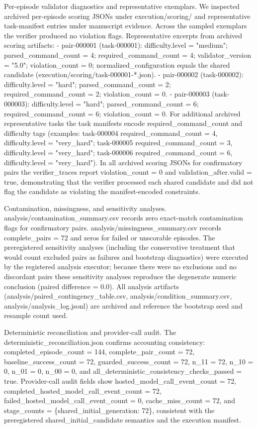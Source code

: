 \documentclass[conference]{IEEEtran}
\begin{document}
Per-episode validator diagnostics and representative exemplars. We inspected archived per-episode scoring JSONs under execution/scoring/ and representative task-manifest entries under manuscript evidence. Across the sampled exemplars the verifier produced no violation flags. Representative excerpts from archived scoring artifacts:
- pair-000001 (task-000001): difficulty.level = "medium"; parsed\_command\_count = 4; required\_command\_count = 4; validator\_version = "5.0"; violation\_count = 0; normalized\_configuration equals the shared candidate (execution/scoring/task-000001-*.json).
- pair-000002 (task-000002): difficulty.level = "hard"; parsed\_command\_count = 2; required\_command\_count = 2; violation\_count = 0.
- pair-000003 (task-000003): difficulty.level = "hard"; parsed\_command\_count = 6; required\_command\_count = 6; violation\_count = 0.
For additional archived representative tasks the task manifests encode required\_command\_count and difficulty tags (examples: task-000004 required\_command\_count = 4, difficulty.level = "very\_hard"; task-000005 required\_command\_count = 3, difficulty.level = "very\_hard"; task-000006 required\_command\_count = 6, difficulty.level = "very\_hard"). In all archived scoring JSONs for confirmatory pairs the verifier\_traces report violation\_count = 0 and validation\_after.valid = true, demonstrating that the verifier processed each shared candidate and did not flag the candidate as violating the manifest-encoded constraints.

Contamination, missingness, and sensitivity analyses. analysis/contamination\_summary.csv records zero exact-match contamination flags for confirmatory pairs. analysis/missingness\_summary.csv records complete\_pairs = 72 and zeros for failed or unscorable episodes. The preregistered sensitivity analyses (including the conservative treatment that would count excluded pairs as failures and bootstrap diagnostics) were executed by the registered analysis executor; because there were no exclusions and no discordant pairs these sensitivity analyses reproduce the degenerate numeric conclusion (paired difference = 0.0). All analysis artifacts (analysis/paired\_contingency\_table.csv, analysis/condition\_summary.csv, analysis/analysis\_log.jsonl) are archived and reference the bootstrap seed and resample count used.

Deterministic reconciliation and provider-call audit. The deterministic\_reconciliation.json confirms accounting consistency: completed\_episode\_count = 144, complete\_pair\_count = 72, baseline\_success\_count = 72, guarded\_success\_count = 72, n\_11 = 72, n\_10 = 0, n\_01 = 0, n\_00 = 0, and all\_deterministic\_consistency\_checks\_passed = true. Provider-call audit fields show hosted\_model\_call\_event\_count = 72, completed\_hosted\_model\_call\_event\_count = 72, failed\_hosted\_model\_call\_event\_count = 0, cache\_miss\_count = 72, and stage\_counts = \{shared\_initial\_generation: 72\}, consistent with the preregistered shared\_initial\_candidate semantics and the execution manifest.
\end{document}
